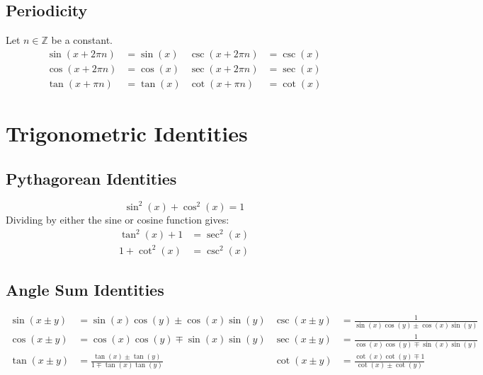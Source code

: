 \documentclass{article}
\begin{document}
\subsection{Periodicity}
Let \(n\in\mathbb{Z}\) be a constant.
\begin{align*}
    \sin{\left( x+2\pi n \right)} & = \sin{\left( x \right)} & \csc{\left( x+2\pi n \right)} & = \csc{\left( x \right)} \\
    \cos{\left( x+2\pi n \right)} & = \cos{\left( x \right)} & \sec{\left( x+2\pi n \right)} & = \sec{\left( x \right)} \\
    \tan{\left( x+\pi n \right)}  & = \tan{\left( x \right)} & \cot{\left( x+\pi n \right)}  & = \cot{\left( x \right)}
\end{align*}
\section{Trigonometric Identities}
\subsection{Pythagorean Identities}
\begin{equation*}
    \sin^2{\left( x \right)} + \cos^2{\left( x \right)} = 1
\end{equation*}
Dividing by either the sine or cosine function gives:
\begin{align*}
    \tan^2{\left( x \right)} + 1 & = \sec^2{\left( x \right)} \\
    1 + \cot^2{\left( x \right)} & = \csc^2{\left( x \right)}
\end{align*}
\subsection{Angle Sum Identities}
\begin{align*}
    \sin{\left( x\pm y \right)} & = \sin{\left( x \right)} \cos{\left( y \right)} \pm \cos{\left( x \right)} \sin{\left( y \right)}           & \csc{\left( x\pm y \right)} & = \frac{1}{\sin{\left( x \right)} \cos{\left( y \right)} \pm \cos{\left( x \right)} \sin{\left( y \right)}} \\
    \cos{\left( x\pm y \right)} & = \cos{\left( x \right)} \cos{\left( y \right)} \mp \sin{\left( x \right)} \sin{\left( y \right)}           & \sec{\left( x\pm y \right)} & = \frac{1}{\cos{\left( x \right)} \cos{\left( y \right)} \mp \sin{\left( x \right)} \sin{\left( y \right)}} \\
    \tan{\left( x\pm y \right)} & = \frac{\tan{\left( x \right)}\pm\tan{\left( y \right)}}{1\mp \tan{\left( x \right)}\tan{\left( y \right)}} & \cot{\left( x\pm y \right)} & = \frac{\cot{\left( x \right)}\cot{\left( y \right)}\mp 1}{\cot{\left( x \right)}\pm\cot{\left( y \right)}}
\end{align*}
\end{document}
